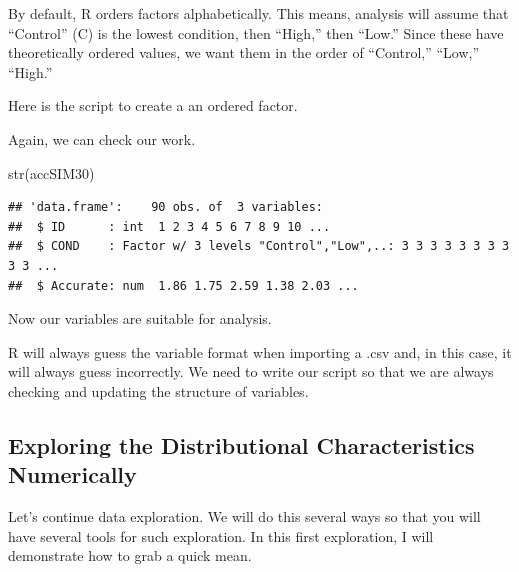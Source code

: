 \documentclass[
  english,
]{book}
\newenvironment{Shaded}{\begin{snugshade}}{\end{snugshade}}
\newcommand{\AttributeTok}[1]{\textcolor[rgb]{0.77,0.63,0.00}{#1}}
\newcommand{\FunctionTok}[1]{\textcolor[rgb]{0.00,0.00,0.00}{#1}}
\newcommand{\NormalTok}[1]{#1}
\newcommand{\OtherTok}[1]{\textcolor[rgb]{0.56,0.35,0.01}{#1}}
\newcommand{\SpecialCharTok}[1]{\textcolor[rgb]{0.00,0.00,0.00}{#1}}
\newcommand{\StringTok}[1]{\textcolor[rgb]{0.31,0.60,0.02}{#1}}
\begin{document}
By default, R orders factors alphabetically. This means, analysis will assume that ``Control'' (C) is the lowest condition, then ``High,'' then ``Low.'' Since these have theoretically ordered values, we want them in the order of ``Control,'' ``Low,'' ``High.''

Here is the script to create a an ordered factor.

\begin{Shaded}
\end{Shaded}

Again, we can check our work.

\begin{Shaded}
\begin{Highlighting}[]
\FunctionTok{str}\NormalTok{(accSIM30)}
\end{Highlighting}
\end{Shaded}

\begin{verbatim}
## 'data.frame':    90 obs. of  3 variables:
##  $ ID      : int  1 2 3 4 5 6 7 8 9 10 ...
##  $ COND    : Factor w/ 3 levels "Control","Low",..: 3 3 3 3 3 3 3 3 3 3 ...
##  $ Accurate: num  1.86 1.75 2.59 1.38 2.03 ...
\end{verbatim}

Now our variables are suitable for analysis.

R will always guess the variable format when importing a .csv and, in this case, it will always guess incorrectly. We need to write our script so that we are always checking and updating the structure of variables.

\hypertarget{exploring-the-distributional-characteristics-numerically}{%
\subsection{Exploring the Distributional Characteristics Numerically}\label{exploring-the-distributional-characteristics-numerically}}

Let's continue data exploration. We will do this several ways so that you will have several tools for such exploration. In this first exploration, I will demonstrate how to grab a quick mean.
\end{document}
